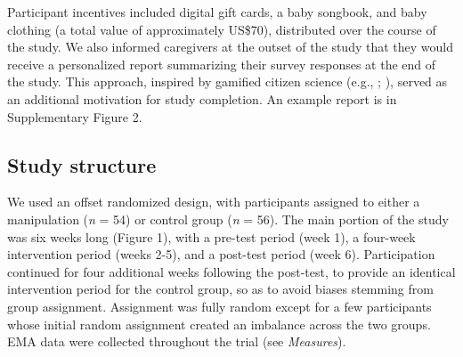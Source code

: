 \documentclass[
]{article}
\begin{document}
Participant incentives included digital gift cards, a baby songbook, and
baby clothing (a total value of approximately US\$70), distributed over
the course of the study. We also informed caregivers at the outset of
the study that they would receive a personalized report summarizing
their survey responses at the end of the study. This approach, inspired
by gamified citizen science (e.g., ; ), served as an
additional motivation for study completion. An example report is in
Supplementary Figure 2.

\subsection{Study structure}\label{study-structure}

We used an offset randomized design, with participants assigned to
either a manipulation (\emph{n} = 54) or control group (\emph{n} = 56).
The main portion of the study was six weeks long (Figure 1), with a
pre-test period (week 1), a four-week intervention period (weeks 2-5),
and a post-test period (week 6). Participation continued for four
additional weeks following the post-test, to provide an identical
intervention period for the control group, so as to avoid biases
stemming from group assignment. Assignment was fully random except for a
few participants whose initial random assignment created an imbalance
across the two groups. EMA data were collected throughout the trial (see
\emph{Measures}).
\end{document}
